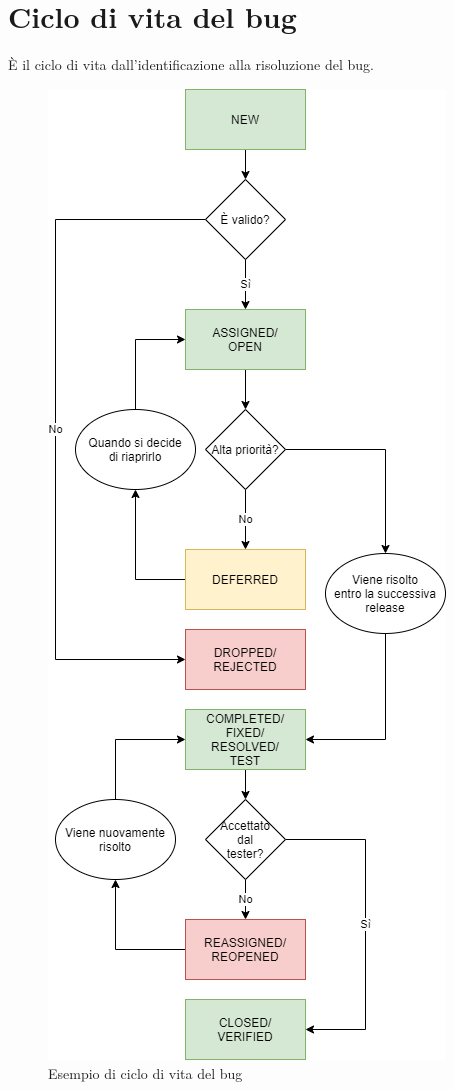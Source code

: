 \documentclass[11pt,a4paper]{book}
\begin{document}
\section{Ciclo di vita del bug}\label{par: Defect lifecycle}
È il ciclo di vita dall'identificazione alla risoluzione del bug.
\begin{figure}[h!]
	\begin{center}
		\includegraphics[scale=0.6]{img/003.png}
		\caption{Esempio di ciclo di vita del bug}
		\label{fig: 003}
	\end{center}
\end{figure}
\end{document}
